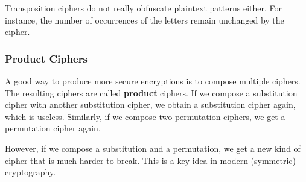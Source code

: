 Transposition ciphers do not really obfuscate plaintext patterns either.
For instance, the number of occurrences of the letters remain unchanged by the cipher.

\subsubsection{Product Ciphers}
 
A good way to produce more secure encryptions is to compose multiple ciphers.
The resulting ciphers are called \textbf{product} ciphers.
If we compose a substitution cipher with another substitution cipher, we obtain a substitution cipher again, which is useless.
Similarly, if we compose two permutation ciphers, we get a permutation cipher again.

However, if we compose a substitution and a permutation, we get a new kind of cipher that is much harder to break.
This is a key idea in modern (symmetric) cryptography. 
